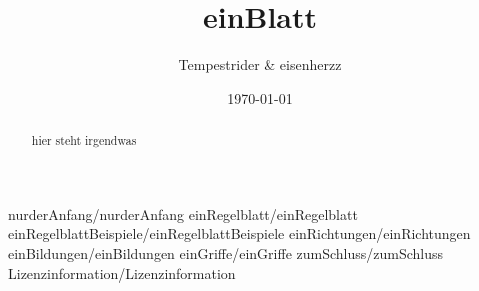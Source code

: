 \documentclass[11pt,a4paper]{scrreprt}
\date{\today}
\author{Tempestrider \& eisenherzz}
\title{einBlatt}
\begin{document}
\maketitle

\begin{abstract}
hier steht irgendwas
\end{abstract}




\tableofcontents

 {nurderAnfang/nurderAnfang}
 {einRegelblatt/einRegelblatt}
 {einRegelblattBeispiele/einRegelblattBeispiele}
 {einRichtungen/einRichtungen}
 {einBildungen/einBildungen}
 {einGriffe/einGriffe}
 {zumSchluss/zumSchluss}
 {Lizenzinformation/Lizenzinformation}

\listoftables
\end{document}
